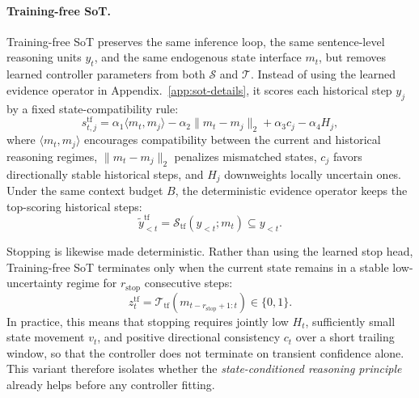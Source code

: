 \paragraph{Training-free SoT.}
Training-free SoT preserves the same inference loop, the same sentence-level reasoning units \(y_t\), and the same endogenous state interface \(m_t\), but removes learned controller parameters from both \(\mathcal{S}\) and \(\mathcal{T}\). 
Instead of using the learned evidence operator in Appendix.~\ref{app:sot-details}, it scores each historical step \(y_j\) by a fixed state-compatibility rule:
\begin{equation}
s^{\mathrm{tf}}_{t,j}
=
\alpha_1\langle m_t,m_j\rangle
-\alpha_2\|m_t-m_j\|_2
+\alpha_3 c_j
-\alpha_4 H_j,
\label{eq:app_tf_score}
\end{equation}
where \(\langle m_t,m_j\rangle\) encourages compatibility between the current and historical reasoning regimes, \(\|m_t-m_j\|_2\) penalizes mismatched states, \(c_j\) favors directionally stable historical steps, and \(H_j\) downweights locally uncertain ones. 
Under the same context budget \(B\), the deterministic evidence operator keeps the top-scoring historical steps:
\begin{equation}
\widetilde{y}_{<t}^{\mathrm{tf}}
=
\mathcal{S}_{\mathrm{tf}}(y_{<t};m_t)
\subseteq y_{<t}.
\label{eq:app_tf_select}
\end{equation}

Stopping is likewise made deterministic. 
Rather than using the learned stop head, Training-free SoT terminates only when the current state remains in a stable low-uncertainty regime for \(r_{\mathrm{stop}}\) consecutive steps:
\begin{equation}
z_t^{\mathrm{tf}}=\mathcal{T}_{\mathrm{tf}}(m_{t-r_{\mathrm{stop}}+1:t})\in\{0,1\}.
\label{eq:app_tf_stop}
\end{equation}
In practice, this means that stopping requires jointly low \(H_t\), sufficiently small state movement \(v_t\), and positive directional consistency \(c_t\) over a short trailing window, so that the controller does not terminate on transient confidence alone. 
This variant therefore isolates whether the \emph{state-conditioned reasoning principle} already helps before any controller fitting.

